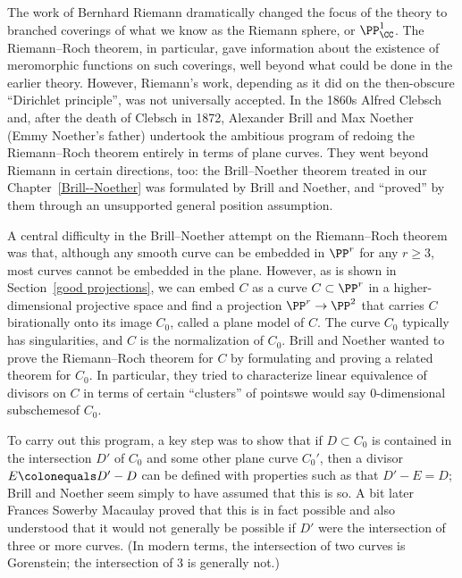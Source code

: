 The work of Bernhard Riemann dramatically changed the focus of the
%
theory to branched coverings of
what we know as the Riemann sphere, or $\PP^1_\CC$.
The
Riemann--Roch theorem,
%
in particular, gave
information about the existence of meromorphic functions on such
coverings, well beyond what could be done in the earlier theory.
However, Riemann's work, depending as it did on the then-obscure
%
``Dirichlet principle'', was not universally accepted. In the 1860s
%
%
%
Alfred Clebsch and, after the death of Clebsch  in 1872, Alexander
Brill and Max Noether (Emmy Noether's father) undertook the ambitious
program of redoing the Riemann--Roch theorem entirely in terms of
plane curves. They went beyond Riemann in certain directions, too: the
Brill--Noether theorem treated in our Chapter~\ref{Brill--Noether} was
formulated by Brill and Noether, and ``proved'' by them through an
unsupported general position assumption.

A central difficulty in the Brill--Noether attempt on the Riemann--Roch theorem was that,
although any smooth curve can be embedded in $\PP^r$ for any $r \geq 3$, most curves cannot be embedded in the plane.
However, as is shown in Section~\ref{good projections}, we can embed
$C$ as a curve $ C \subset \PP^r$ in a higher-dimensional projective
space and find a projection $\PP^r \to \PP^2$ that carries $C$
birationally onto its image $C_0$, called a
plane model
%
of $C$. The
curve $C_0$ typically has singularities, and $C$ is the normalization
of $C_0$. Brill and Noether wanted to prove the Riemann--Roch theorem
for $C$ by formulating and proving a related theorem for $C_0$. In
particular, they tried to characterize
linear equivalence of divisors
%
%
on $C$ in terms of certain ``clusters'' of points\emdash we would say
0-dimensional subschemes\emdash of $C_0$.

To carry out this program, a key step was to show that if $D\subset C_0$ is contained in the intersection
$D'$ of $C_0$ and some other plane curve $C_0'$, then a divisor
$E \colonequals D'-D$ can be defined with properties such as that $D'-E = D$;
Brill and Noether seem simply to have assumed that this is so. A bit
%
later Frances Sowerby Macaulay proved that this is in fact possible
and also understood that it would not generally be possible if $D'$
were the intersection of three or more curves.
(In modern terms, the intersection of two curves is
%
Gorenstein;
the intersection of 3 is generally not.)

